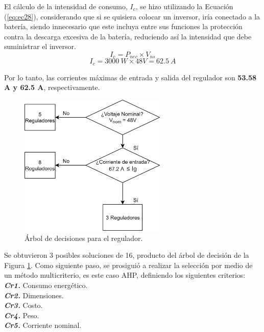 El cálculo de la intensidad de consumo, \textit{$I_c$}, se hizo utilizando la Ecuación (\ref{eq:ec28}), considerando que si se quisiera colocar un inversor, iría conectado a la batería, siendo innecesario que este incluya entre sus funciones la protección contra la descarga excesiva de la batería, reduciendo así la intensidad que debe suministrar el inversor.
\begin{equation}\label{eq:ec28}
I_{c} = P_{nec} \times V_{ns}
\end{equation}
\begin{equation}\label{eq:ec28sust}
I_{c} = 3000 \ W \times 48 V=62.5 \ A
\end{equation}

Por lo tanto, las corrientes máximas de entrada y salida del regulador son \textbf{53.58 A y 62.5 A}, respectivamente.
\begin{figure}[H]
	\centering
	\includegraphics[width=7cm]{imagenes/Arrutareg}
	\caption{Árbol de decisiones para el regulador.}
	\label{fig:Arrutareg}
\end{figure}

Se obtuvieron 3 posibles soluciones de 16, producto del árbol de decisión de la Figura \ref{fig:Arrutareg}. Como siguiente paso, se prosiguió a realizar la selección por medio de un método multicriterio, es este caso AHP, definiendo los siguientes criterios:\\
\textbf{\textit{Cr1.}} Consumo energético.\\
\textbf{\textit{Cr2.}} Dimensiones.\\
\textbf{\textit{Cr3.}} Costo.\\
\textbf{\textit{Cr4. }}Peso. \\
\textbf{\textit{Cr5.}} Corriente nominal.\\

